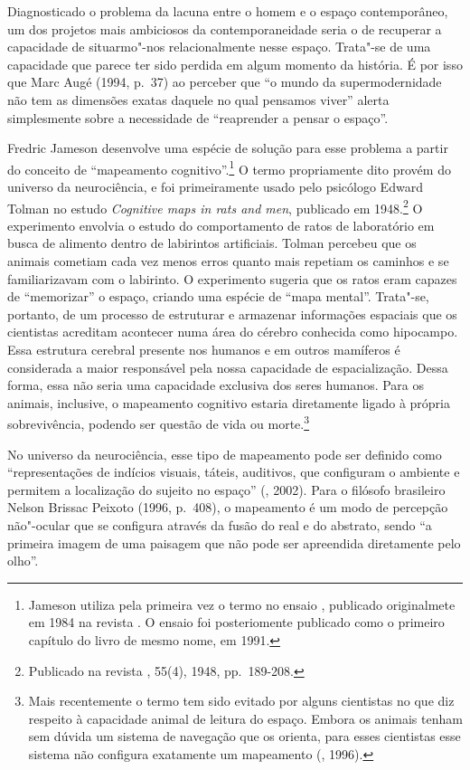 Diagnosticado o problema da lacuna entre o homem e o espaço
contemporâneo, um dos projetos mais ambiciosos da contemporaneidade
seria o de recuperar a capacidade de situarmo"-nos relacionalmente nesse
espaço. Trata"-se de uma capacidade que parece ter sido perdida em algum
momento da história. É por isso que Marc Augé (1994, p.~37) ao perceber que ``o mundo
da supermodernidade não tem as dimensões exatas daquele no qual
pensamos viver'' alerta simplesmente sobre a necessidade de
``reaprender a pensar o espaço''.

Fredric Jameson desenvolve uma espécie de solução para esse problema a
partir do conceito de ``mapeamento cognitivo''.\footnote{Jameson utiliza
  pela primeira vez o termo no ensaio {}, publicado originalmete em 1984 na
  revista {}. O ensaio foi posteriomente publicado como o
  primeiro capítulo do livro de mesmo nome, em 1991.} O termo
propriamente dito provém do universo da neurociência, e foi
primeiramente usado pelo psicólogo Edward Tolman no estudo
\emph{Cognitive maps in rats and men}, publicado em 1948.\footnote{Publicado na
  revista {}, 55(4), 1948, pp.~189-208.} O
experimento envolvia o estudo do comportamento de ratos de laboratório
em busca de alimento dentro de labirintos artificiais. Tolman percebeu
que os animais cometiam cada vez menos erros quanto mais repetiam os
caminhos e se familiarizavam com o labirinto. O experimento sugeria que
os ratos eram capazes de ``memorizar'' o espaço, criando uma espécie de
``mapa mental''. Trata"-se, portanto, de um processo de estruturar e
armazenar informações espaciais que os cientistas acreditam acontecer
numa área do cérebro conhecida como hipocampo. Essa estrutura cerebral
presente nos humanos e em outros mamíferos é considerada a maior
responsável pela nossa capacidade de espacialização. Dessa forma, essa
não seria uma capacidade exclusiva dos seres humanos. Para os animais,
inclusive, o mapeamento cognitivo estaria diretamente ligado à própria
sobrevivência, podendo ser questão de vida ou morte.\footnote{Mais
  recentemente o termo tem sido evitado por alguns cientistas no que diz
  respeito à capacidade animal de leitura do espaço. Embora os animais
  tenham sem dúvida um sistema de navegação que os orienta, para esses
  cientistas esse sistema não configura exatamente um mapeamento
  (, 1996).}

No universo da neurociência, esse tipo de mapeamento pode ser definido
como ``representações de indícios visuais, táteis, auditivos, que
configuram o ambiente e permitem a localização do sujeito no espaço''
(, 2002). Para o filósofo brasileiro Nelson Brissac Peixoto (1996, p.~408), o mapeamento é um modo de percepção não"-ocular que se configura
através da fusão do real e do abstrato, sendo ``a primeira imagem de uma
paisagem que não pode ser apreendida diretamente pelo olho''.


